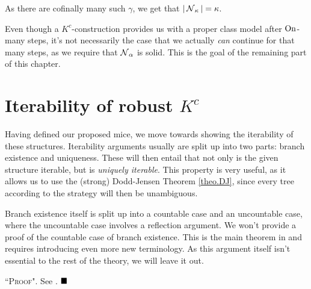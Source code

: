 {\qquad As there are cofinally many such $\gamma$, we get that $|\operatorname{\mathcal{N}}_\kappa|=\kappa$.
}

Even though a $K^c$-construction provides us with a proper class model after $\operatorname{On}$-many steps, it's not necessarily the case that we actually \textit{can} continue for that many steps, as we require that $\operatorname{\mathcal{N}}_\alpha$ is solid. This is the goal of the remaining part of this chapter.


\section{Iterability of robust $K^c$}

Having defined our proposed mice, we move towards showing the iterability of these structures. Iterability arguments usually are split up into two parts: branch existence and uniqueness. These will then entail that not only is the given structure iterable, but is \textit{uniquely iterable}. This property is very useful, as it allows us to use the (strong) Dodd-Jensen Theorem \ref{theo.DJ}, since every tree according to the strategy will then be unambiguous.

\qquad Branch existence itself is split up into a countable case and an uncountable case, where the uncountable case involves a reflection argument. We won't provide a proof of the countable case of branch existence. This is the main theorem in \cite{RobustExtenders} and requires introducing even more new terminology. As this argument itself isn't essential to the rest of the theory, we will leave it out.

\textsc{``Proof".}
See \cite{RobustExtenders}.
$\qed$\\

